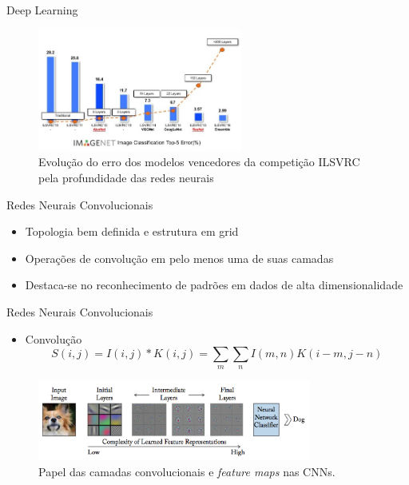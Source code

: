 \begin{frame}{Deep Learning}
   \ \  \\[0.1cm]
   \begin{figure}[ht]
   	\centering
   	\caption{Evolução do erro dos modelos vencedores da competição ILSVRC pela profundidade das redes neurais}
   	\label{fig:compara_redes_ilsvrc}
   	\includegraphics[width=0.6\textwidth]{img/compara_redes_ilsvrc.png}
   \end{figure}
\end{frame}

\begin{frame}{Redes Neurais Convolucionais}
   \ \  \\[0.1cm]
   \begin{itemize}
     \item Topologia bem definida e estrutura em grid
     \item Operações de convolução em pelo menos uma de suas camadas
     \item Destaca-se no reconhecimento de padrões em dados de alta dimensionalidade
   \end{itemize}
\end{frame}

\begin{frame}{Redes Neurais Convolucionais}
   \ \  \\[0.1cm]
   \begin{itemize}
     \item Convolução
     \begin{equation}
      S(i,j) = I(i,j)*K(i,j) = \sum_{m}\sum_{n}I(m,n)K(i-m,j-n)\label{eq:conv_img}
     \end{equation}
   \end{itemize}
   \begin{figure}[!h]
   	\centering
   	\label{fig:convolutions}
   	\includegraphics[width=0.8\textwidth]{./img/fundamenta/convolutions}
     \caption{Papel das camadas convolucionais e \emph{feature maps} nas CNNs.}
   \end{figure}
\end{frame}

